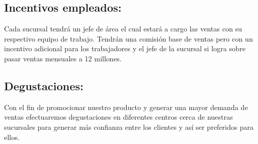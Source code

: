 \subsection{Incentivos empleados:}Cada sucursal tendr\'a un jefe de \'area el cual estar\'a a cargo las ventas con su  respectivo equipo de trabajo.  Tendr\'an una comisi\'on base de ventas pero con un incentivo adicional para los trabajadores y el jefe de la sucursal si logra sobre pasar ventas mensuales a 12 millones.%
\subsection{Degustaciones:} Con el fin de promocionar nuestro producto y generar una mayor demanda de ventas  efectuaremos degustaciones en diferentes centros cerca de nuestras sucursales para generar m\'as confianza entre los clientes y as\'i ser preferidos para ellos.
%

